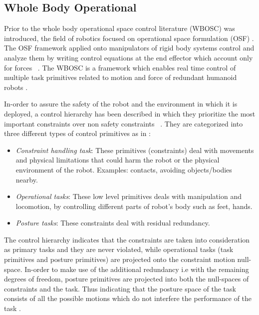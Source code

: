 \subsection{Whole Body Operational}
\label{WBS-OCP}
Prior to the whole body operational space control literature (WBOSC) \cite{khatib2004whole} was introduced, the field of robotics focused on operational space formulation (OSF) \cite{khatib1987unified}. The OSF framework applied onto manipulators of rigid body systems control and analyze them by writing control equations at the end effector which account only for forces ~\cite{khatib1987unified}.
The WBOSC is a framework which enables real time control of multiple task primitives related to motion and force of redundant humanoid robots \cite{fok2016controlit}.


In-order to assure the safety of the robot and the environment in which it is deployed, a control hierarchy has been described in which they prioritize the most important constraints over non safety constraints
~\cite{sentis2005synthesis}\cite{khatib2004whole}. They are categorized into three different types of control primitives as in \cite{sentis2006whole}: 
\begin{itemize}
	\item \textit{Constraint handling task}: These primitives (constraints) deal with movements and physical limitations that could harm the robot or the physical environment of the robot. Examples: contacts, avoiding objects/bodies nearby.
	\item \textit{Operational tasks}: These low level primitives deals with manipulation and locomotion, by controlling different parts of robot's body such as feet, hands.
	\item \textit{Posture tasks}: These constraints deal with residual redundancy.
\end{itemize}


The control hierarchy indicates that the constraints are taken into consideration as primary tasks and they are never violated, while operational tasks (task primitives and posture primitives) are projected onto the constraint motion null-space. In-order to make use of the additional redundancy i.e with the remaining degrees of freedom, posture primitives are projected into both the null-spaces of constraints and the task. Thus indicating that the posture space of the task consists of all the possible motions which do not interfere the performance of the task \cite{sentis2006whole} \cite{khatib2004whole}.


